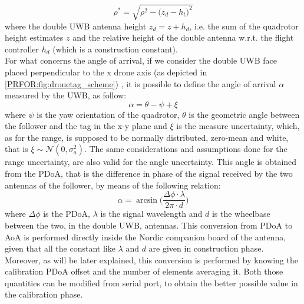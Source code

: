 \begin{equation}
    \rho^* = \sqrt{\rho^2 - \big( z_d - h_t\big)^2}
\end{equation}
where the double UWB antenna height $z_d = z + h_d$, i.e. the sum of the quadrotor height estimates $z$ and the relative height of the double antenna w.r.t. the flight controller $h_d$ (which is a construction constant).\\

For what concerns the angle of arrival, if we consider the double UWB face placed perpendicular to the x drone axis (as depicted in \autoref{PRFOR:fig:dronetag_scheme}) , it is possible to define the angle of arrival \textbf{$\alpha$} measured by the UWB, as follow:
\begin{equation}
    \alpha = \theta -\psi+ \xi
\end{equation}
where $\psi$ is the yaw orientation of the quadrotor, $\theta$ is the geometric angle between the follower and the tag in the x-y plane and $\xi$ is the measure uncertainty, which, as for the range, is supposed to be normally distributed, zero-mean and white, that is $\xi \sim \mathcal{N}(0,\sigma_a^2)$. The same considerations and assumptions done for the range uncertainty, are also valid for the angle uncertainty. This angle is obtained from the PDoA, that is the difference in phase of the signal received by the two antennas of the follower, by means of the following relation:
\begin{equation}\label{PRFOR:eq:aoa-pdod}
    \alpha = \arcsin \Bigg( \frac{\Delta\phi \cdot \lambda}{2\pi\cdot d} \Bigg)
\end{equation}
where $\Delta\phi$ is the PDoA, $\lambda$ is the signal wavelength and $d$ is the wheelbase between the two, in the double UWB, antennas. This conversion from PDoA to AoA is performed directly inside the Nordic companion board of the antenna, given that all the constant like $\lambda$ and $d$ are given in construction phase. Moreover, as will be later explained, this conversion is performed by knowing the calibration PDoA offset and the number of elements averaging it. Both those quantities can be modified from serial port, to obtain the better possible value in the calibration phase.

